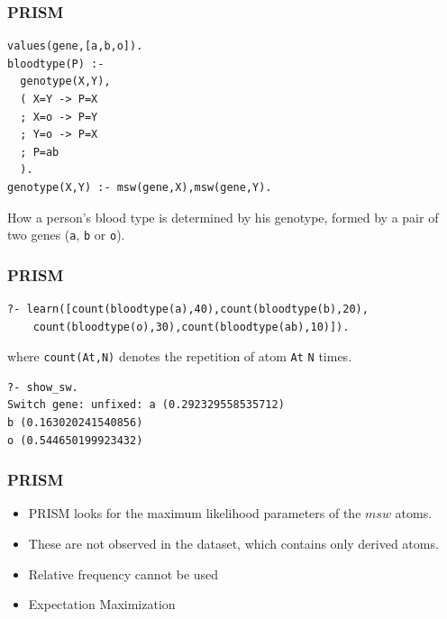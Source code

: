 \documentclass[trans,aspectratio=1610]{beamer}
\begin{document}
\begin{frame}[fragile]
  \frametitle{PRISM}
\begin{verbatim}
values(gene,[a,b,o]).
bloodtype(P) :-
  genotype(X,Y),
  ( X=Y -> P=X
  ; X=o -> P=Y
  ; Y=o -> P=X
  ; P=ab
  ).
genotype(X,Y) :- msw(gene,X),msw(gene,Y).
\end{verbatim}
How a person's blood type is determined by his genotype, formed by a pair of two genes (\verb|a|, \verb|b|
or \verb|o|).
\end{frame}
\begin{frame}[fragile]
  \frametitle{PRISM}
  \begin{scriptsize}
\begin{verbatim}
?- learn([count(bloodtype(a),40),count(bloodtype(b),20),
    count(bloodtype(o),30),count(bloodtype(ab),10)]).
\end{verbatim}
\end{scriptsize}
where \verb|count(At,N)| denotes the repetition of atom \verb|At| \verb|N| times.
\begin{scriptsize}
\begin{verbatim}
?- show_sw.
Switch gene: unfixed: a (0.292329558535712) 
b (0.163020241540856)
o (0.544650199923432)
\end{verbatim}
\end{scriptsize}
\end{frame}
\begin{frame}
  \frametitle{PRISM}
\begin{itemize}
\item
 PRISM looks for the maximum likelihood parameters of the $msw$ atoms. 
 \item These are
not observed in the dataset, which contains only derived atoms. 
\item Relative frequency
cannot be used 
\item Expectation Maximization
\end{itemize}
\end{frame}
\end{document}
